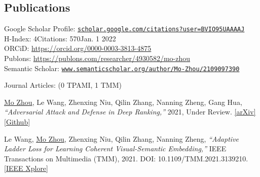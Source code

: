 \documentclass[10pt,margin,line,pifont,palatino,courier]{res}
\begin{document}
\begin{resume}

%


\section{\sc Publications}
	Google Scholar Profile:
	\href{https://scholar.google.com/citations?user=BVIO95UAAAAJ}{\small\texttt{scholar.google.com/citations?user=BVIO95UAAAAJ}}\\
	\hspace*{9.7em}H-Index: 4\qquad Citations: 570\qquad Jan. 1 2022\\
	\hspace*{6.1em}ORCiD: {\small\url{https://orcid.org/0000-0003-3813-4875}}\\
	\hspace*{5.9em}Publons: {\small\url{https://publons.com/researcher/4930582/mo-zhou}}\\
	\hspace*{2.1em}Semantic Scholar: \href{https://www.semanticscholar.org/author/Mo-Zhou/2109097390}{\small\texttt{www.semanticscholar.org/author/Mo-Zhou/2109097390}}

	{\sc Journal Articles:} \hfill(0 TPAMI, 1 TMM)\\

\begin{enumerate}[noitemsep, leftmargin=*, label={[J0{\arabic*}]}]

\item \underline{Mo Zhou}, Le Wang, Zhenxing Niu, Qilin Zhang, Nanning Zheng, Gang Hua,
\textit{``Adversarial Attack and Defense in Deep Ranking,''}
2021, Under Review.
\href{https://arxiv.org/abs/2106.03614}{[arXiv]}
\href{https://cdluminate.github.io/robrank/}{[Github]}

\item Le Wang, \underline{Mo Zhou}, Zhenxing Niu, Qilin Zhang, Nanning Zheng,
\textit{``Adaptive Ladder Loss for Learning Coherent Visual-Semantic Embedding,''}
IEEE Transactions on Multimedia (TMM), 2021.
DOI: 10.1109/TMM.2021.3139210.
\href{https://ieeexplore.ieee.org/document/9665378}{[IEEE Xplore]}


\end{enumerate}
\end{resume}
\end{document}
